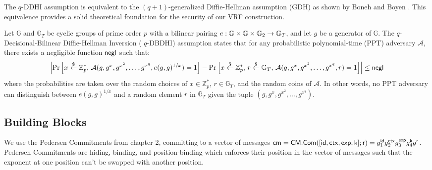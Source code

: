 \begin{remark}
The $q$-DDHI assumption is equivalent to the $(q+1)$-generalized Diffie-Hellman assumption (GDH) as shown by Boneh and Boyen \cite{kanade_efficient_2004}. This equivalence provides a solid theoretical foundation for the security of our VRF construction.
\end{remark}

\begin{definition}
Let $\mathbb{G}$ and $\mathbb{G}_T$ be cyclic groups of prime order $p$ with a bilinear pairing $e: \mathbb{G} \times \mathbb{G} \times \mathbb{G}_2 \to \mathbb{G}_T$, and let $g$ be a generator of $\mathbb{G}$. The $q$-Decisional-Bilinear Diffie-Hellman Inversion ( $q$-DBDHI) assumption states that for any probabilistic polynomial-time (PPT) adversary $\mathcal{A}$, there exists a negligible function $\mathsf{negl}$ such that:
\[
\left| \Pr\left[ x \stackrel{\$}{\leftarrow} \mathbb{Z}_p^*, \, \mathcal{A}(g, g^x, g^{x^2}, \ldots, g^{x^q}, e(g, g)^{1/x}) = 1 \right] - \Pr\left[ x \stackrel{\$}{\leftarrow} \mathbb{Z}_p^*, \, r \stackrel{\$}{\leftarrow} \mathbb{G}_T, \, \mathcal{A}(g, g^x, g^{x^2}, \ldots, g^{x^q}, r) = 1 \right] \right| \leq \mathsf{negl}
\]
where the probabilities are taken over the random choices of $x \in \mathbb{Z}_p^*$, $r \in \mathbb{G}_T$, and the random coins of $\mathcal{A}$. In other words, no PPT adversary can distinguish between $e(g, g)^{1/x}$ and a random element $r$ in $\mathbb{G}_T$ given the tuple $(g, g^x, g^{x^2}, \ldots, g^{x^q})$.
\end{definition}



\subsection{Building Blocks}
We use the Pedersen Commitments from chapter 2, committing to a vector of messages $\mathsf{cm} = \mathsf{CM.Com}([\mathsf{id}, \mathsf{ctx}, \mathsf{exp}, \mathsf{k}];\mathsf{r}) = g_1^{\mathsf{id}} g_2^{\mathsf{ctx}} g_3^{\mathsf{exp}} g_4^{\mathsf{k}} g^{\mathsf{r}}$. Pedersen Commitments are hiding, binding, and position-binding which enforces their position in the vector of messages such that the exponent at one position can't be swapped with another position. 







